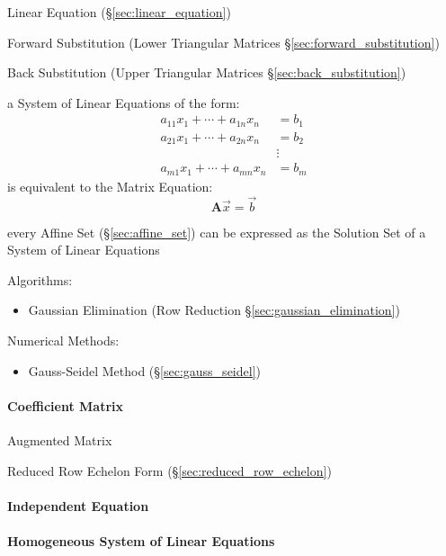 Linear Equation (\S\ref{sec:linear_equation})

Forward Substitution (Lower Triangular Matrices
\S\ref{sec:forward_substitution})

Back Substitution (Upper Triangular Matrices \S\ref{sec:back_substitution})

a System of Linear Equations of the form:
\begin{align*}
  a_{11}x_1 + \cdots + a_{1n}x_n & = b_1 \\
  a_{21}x_1 + \cdots + a_{2n}x_n & = b_2 \\
                                 & \vdots \\
  a_{m1}x_1 + \cdots + a_{mn}x_n & = b_m
\end{align*}
is equivalent to the Matrix Equation:
\[
  \mathbf{A}\vec{x} = \vec{b}
\]

every Affine Set (\S\ref{sec:affine_set}) can be expressed as the Solution Set
of a System of Linear Equations

Algorithms:
\begin{itemize}
  \item Gaussian Elimination (Row Reduction \S\ref{sec:gaussian_elimination})
\end{itemize}

Numerical Methods:
\begin{itemize}
  \item Gauss-Seidel Method (\S\ref{sec:gauss_seidel})
\end{itemize}



\paragraph{Coefficient Matrix}\label{sec:coefficient_matrix}\hfill

Augmented Matrix

Reduced Row Echelon Form (\S\ref{sec:reduced_row_echelon})



\paragraph{Independent Equation}\label{sec:independent_equation}\hfill

\paragraph{Homogeneous System of Linear Equations}\hfill
\label{sec:homogeneous_system}

